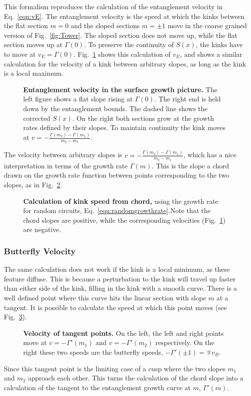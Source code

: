 This formalism reproduces the calculation of the entanglement velocity in Eq.~\ref{eqn:vE}. The entanglement velocity is the speed at which the kinks between the flat section $m=0$ and the sloped sections $m=\pm1$ move in the coarse grained version of Fig.~\ref{fig:Tower}. The sloped section does not move up, while the flat section moves up at $\Gamma(0)$. To preserve the continuity of $S(x)$, the kinks have to move at $v_E=\Gamma(0)$. Fig.~\ref{fig:entanglevel} shows this calculation of $v_E$, and shows a similar calculation for the velocity of a kink between arbitrary slopes, as long as the kink is a local maximum.
\begin{figure}
	\centering
	
	\caption{\textbf{Entanglement velocity in the surface growth picture.} The left figure shows a flat slope rising at $\Gamma(0)$. The right end is held down by the entanglement bounds. The dashed line shows the corrected $S(x)$. On the right both sections grow at the growth rates defined by their slopes. To maintain continuity the kink moves at $v=-\frac{\Gamma(m_2)-\Gamma(m_1)}{m_2-m_1}$.}
	\label{fig:entanglevel}
\end{figure}

The velocity between arbitrary slopes is $v = - \frac{\Gamma(m_2)-\Gamma(m_1)}{m_2-m_1}$, which has a nice interpretation in terms of the growth rate $\Gamma(m)$. This is the slope a chord drawn on the growth rate function between points corresponding to the two slopes, as in Fig.~\ref{fig:growthchord}.
\begin{figure}
	\centering
	
	\caption{\textbf{Calculation of kink speed from chord,} using the growth rate for random circuits, Eq.~\ref{eqn:randomgrowthrate}.Note that the chord slopes are positive, while the corresponding velocities (Fig.~\ref{fig:entanglevel}) are negative.}
	\label{fig:growthchord}
\end{figure}

\subsubsection{Butterfly Velocity} \label{subsub:v_B}

The same calculation does not work if the kink is a local minimum, as these feature diffuse. This is because a perturbation to the kink will travel up faster than either side of the kink, filling in the kink with a smooth curve. There is a well defined point where this curve hits the linear section with slope $m$ at a tangent. It is possible to calculate the speed at which this point moves (see Fig.~\ref{fig:buttvel}).
\begin{figure}
	\centering
	
	\caption{\textbf{Velocity of tangent points.} On the left, the left and right points move at $v=-\Gamma'(m_1)$ and $v=-\Gamma'(m_2)$ respectively. On the right these two speeds are the butterfly speeds, $-\Gamma'(\pm1) = \mp v_B$.}
	\label{fig:buttvel}
\end{figure}
Since this tangent point is the limiting case of a cusp where the two slopes $m_1$ and $m_2$ approach each other. This turns the calculation of the chord slope into a calculation of the tangent to the entanglement growth curve at $m$, $\Gamma'(m)$.

